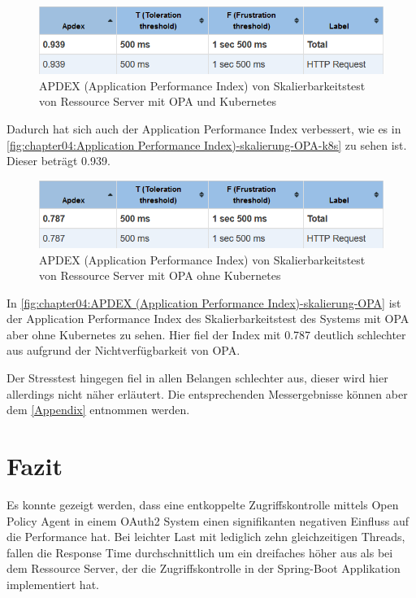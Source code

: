 \begin{figure}[H]
  \centering
  \includegraphics[width=1.0\textwidth]{gfx/APDEX (Application Performance Index)-skalierung-OPA-k8s.png}
  \caption{APDEX (Application Performance Index) von Skalierbarkeitstest von Ressource Server mit OPA und Kubernetes}
  \label{fig:chapter04:Application Performance Index)-skalierung-OPA-k8s}
\end{figure}

Dadurch hat sich auch der Application Performance Index verbessert, wie es in \autoref{fig:chapter04:Application Performance Index)-skalierung-OPA-k8s} zu sehen ist. Dieser beträgt 0.939. 

\begin{figure}[H]
  \centering
  \includegraphics[width=1.0\textwidth]{gfx/APDEX (Application Performance Index)-skalierung-OPA.png}
  \caption{APDEX (Application Performance Index) von Skalierbarkeitstest von Ressource Server mit OPA ohne Kubernetes}
  \label{fig:chapter04:APDEX (Application Performance Index)-skalierung-OPA}
\end{figure}

In \autoref{fig:chapter04:APDEX (Application Performance Index)-skalierung-OPA} ist der Application Performance Index des Skalierbarkeitstest des Systems mit OPA aber ohne Kubernetes zu sehen. Hier fiel der Index mit 0.787 deutlich schlechter aus aufgrund der Nichtverfügbarkeit von OPA.\smallskip

Der Stresstest hingegen fiel in allen Belangen schlechter aus, dieser wird hier allerdings nicht näher erläutert. Die entsprechenden Messergebnisse können aber dem \autoref{Appendix} entnommen werden. 

\section{Fazit}
Es konnte gezeigt werden, dass eine entkoppelte Zugriffskontrolle mittels Open Policy Agent in einem OAuth2 System einen signifikanten negativen Einfluss auf die Performance hat. Bei leichter Last mit lediglich zehn gleichzeitigen Threads, fallen die Response Time durchschnittlich um ein dreifaches höher aus als bei dem Ressource Server, der die Zugriffskontrolle in der Spring-Boot Applikation implementiert hat.\smallskip

